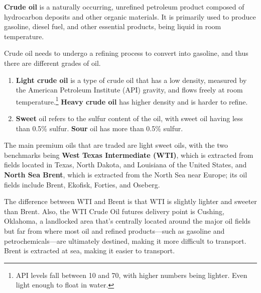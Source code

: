 \documentclass{article}
\begin{document}
      \begin{definition}
        \textbf{Crude oil} is a naturally occurring, unrefined petroleum product composed of hydrocarbon deposits and other organic materials. It is primarily used to produce gasoline, diesel fuel, and other essential products, being liquid in room temperature. 

        Crude oil needs to undergo a refining process to convert into gasoline, and thus there are different grades of oil. 
        \begin{enumerate}
          \item \textbf{Light crude oil} is a type of crude oil that has a low density, measured by the American Petroleum Institute (API) gravity, and flows freely at room temperature.\footnote{API levels fall between 10 and 70, with higher numbers being lighter. Even light enough to float in water. } \textbf{Heavy crude oil} has higher density and is harder to refine. 
          \item \textbf{Sweet} oil refers to the sulfur content of the oil, with sweet oil having less than 0.5\% sulfur. \textbf{Sour} oil has more than 0.5\% sulfur. 
        \end{enumerate}
        The main premium oils that are traded are light sweet oils, with the two benchmarks being \textbf{West Texas Intermediate (WTI)}, which is extracted from fields located in Texas, North Dakota, and Louisiana of the United States, and \textbf{North Sea Brent}, which is extracted from the North Sea near Europe; its oil fields include Brent, Ekofisk, Forties, and Oseberg. 
      \end{definition}

      The difference between WTI and Brent is that WTI is slightly lighter and sweeter than Brent. Also, the WTI Crude Oil futures delivery point is Cushing, Oklahoma, a landlocked area that's centrally located around the major oil fields but far from where most oil and refined products—such as gasoline and petrochemicals—are ultimately destined, making it more difficult to transport. Brent is extracted at sea, making it easier to transport.
\end{document}
